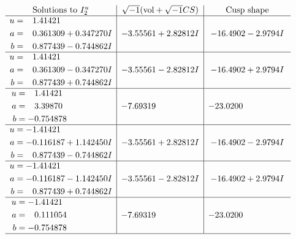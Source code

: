 \documentclass[1p]{elsarticle_modified}
\theoremstyle{definition}
\newcommand{\I}{\sqrt{-1}}
\begin{document}
$$\begin{array}{c|c|c}  
\text{Solutions to }I^u_{2}& \I (\text{vol} + \sqrt{-1}CS) & \text{Cusp shape}\\
 \hline 
\begin{aligned}
u &= \phantom{-}1.41421\phantom{ +0.000000I} \\
a &= \phantom{-}0.361309 + 0.347270 I \\
b &= \phantom{-}0.877439 - 0.744862 I\end{aligned}
 & -3.55561 + 2.82812 I & -16.4902 - 2.9794 I \\ \hline\begin{aligned}
u &= \phantom{-}1.41421\phantom{ +0.000000I} \\
a &= \phantom{-}0.361309 - 0.347270 I \\
b &= \phantom{-}0.877439 + 0.744862 I\end{aligned}
 & -3.55561 - 2.82812 I & -16.4902 + 2.9794 I \\ \hline\begin{aligned}
u &= \phantom{-}1.41421\phantom{ +0.000000I} \\
a &= \phantom{-}3.39870\phantom{ +0.000000I} \\
b &= -0.754878\phantom{ +0.000000I}\end{aligned}
 & -7.69319\phantom{ +0.000000I} & -23.0200\phantom{ +0.000000I} \\ \hline\begin{aligned}
u &= -1.41421\phantom{ +0.000000I} \\
a &= -0.116187 + 1.142450 I \\
b &= \phantom{-}0.877439 - 0.744862 I\end{aligned}
 & -3.55561 + 2.82812 I & -16.4902 - 2.9794 I \\ \hline\begin{aligned}
u &= -1.41421\phantom{ +0.000000I} \\
a &= -0.116187 - 1.142450 I \\
b &= \phantom{-}0.877439 + 0.744862 I\end{aligned}
 & -3.55561 - 2.82812 I & -16.4902 + 2.9794 I \\ \hline\begin{aligned}
u &= -1.41421\phantom{ +0.000000I} \\
a &= \phantom{-}0.111054\phantom{ +0.000000I} \\
b &= -0.754878\phantom{ +0.000000I}\end{aligned}
 & -7.69319\phantom{ +0.000000I} & -23.0200\phantom{ +0.000000I}\\
 \hline 
 \end{array}$$\newpage\newpage\renewcommand{\arraystretch}{1}
\end{document}

